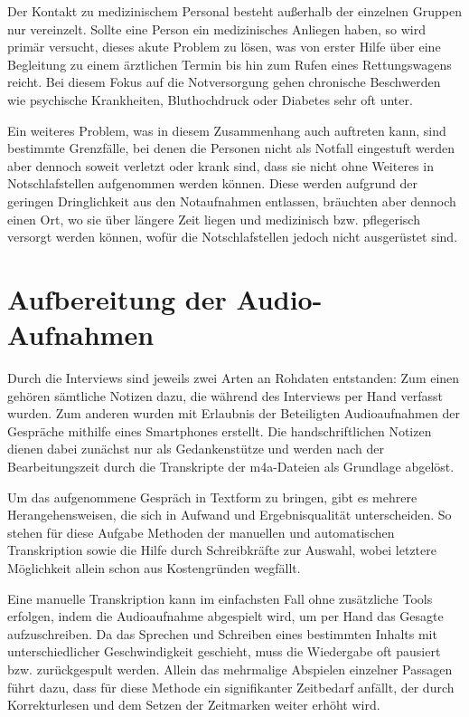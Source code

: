 Der Kontakt zu medizinischem Personal besteht außerhalb der einzelnen Gruppen nur vereinzelt. Sollte eine Person ein medizinisches Anliegen haben, so wird primär versucht, dieses akute Problem zu lösen, was von erster Hilfe über eine Begleitung zu einem ärztlichen Termin bis hin zum Rufen eines Rettungswagens reicht. Bei diesem Fokus auf die Notversorgung gehen chronische Beschwerden wie psychische Krankheiten, Bluthochdruck oder Diabetes sehr oft unter.

Ein weiteres Problem, was in diesem Zusammenhang auch auftreten kann, sind bestimmte Grenzfälle, bei denen die Personen nicht als Notfall eingestuft werden aber dennoch soweit verletzt oder krank sind, dass sie nicht ohne Weiteres in Notschlafstellen aufgenommen werden können. Diese werden aufgrund der geringen Dringlichkeit aus den Notaufnahmen entlassen, bräuchten aber dennoch einen Ort, wo sie über längere Zeit liegen und medizinisch bzw. pflegerisch versorgt werden können, wofür die Notschlafstellen jedoch nicht ausgerüstet sind. 


\section{Aufbereitung der Audio-Aufnahmen}

Durch die Interviews sind jeweils zwei Arten an Rohdaten entstanden: Zum einen gehören sämtliche Notizen dazu, die während des Interviews per Hand verfasst wurden. Zum anderen wurden mit Erlaubnis der Beteiligten Audioaufnahmen der Gespräche mithilfe eines Smartphones erstellt. Die handschriftlichen Notizen dienen dabei zunächst nur als Gedankenstütze und werden nach der Bearbeitungszeit durch die Transkripte der m4a-Dateien als Grundlage abgelöst.

Um das aufgenommene Gespräch in Textform zu bringen, gibt es mehrere Herangehensweisen, die sich in Aufwand und Ergebnisqualität unterscheiden. So stehen für diese Aufgabe Methoden der manuellen und automatischen Transkription sowie die Hilfe durch Schreibkräfte zur Auswahl, wobei letztere Möglichkeit allein schon aus Kostengründen wegfällt.

Eine manuelle Transkription kann im einfachsten Fall ohne zusätzliche Tools erfolgen, indem die Audioaufnahme abgespielt wird, um per Hand das Gesagte aufzuschreiben. Da das Sprechen und Schreiben eines bestimmten Inhalts mit unterschiedlicher Geschwindigkeit geschieht, muss die Wiedergabe oft pausiert bzw. zurückgespult werden. Allein das mehrmalige Abspielen einzelner Passagen führt dazu, dass für diese Methode ein signifikanter Zeitbedarf anfällt, der durch Korrekturlesen und dem Setzen der Zeitmarken weiter erhöht wird.

